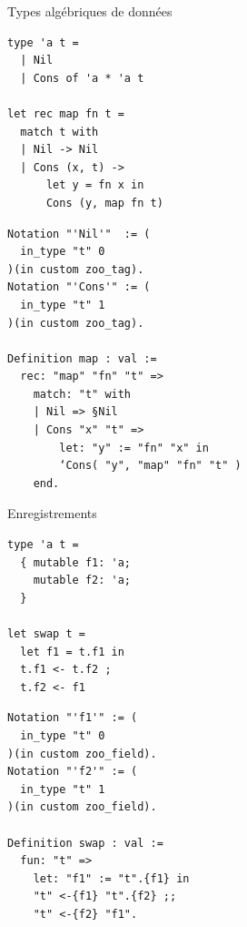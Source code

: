 \begin{frame}[fragile]{Types algébriques de données}
\begin{minipage}{0.49\textwidth}
  \begin{verbatim}
type 'a t =
  | Nil
  | Cons of 'a * 'a t

let rec map fn t =
  match t with
  | Nil -> Nil
  | Cons (x, t) ->
      let y = fn x in
      Cons (y, map fn t)
  \end{verbatim}
\end{minipage}
\begin{minipage}{0.5\textwidth}
  \begin{verbatim}
Notation "'Nil'"  := (
  in_type "t" 0
)(in custom zoo_tag).
Notation "'Cons'" := (
  in_type "t" 1
)(in custom zoo_tag).

Definition map : val :=
  rec: "map" "fn" "t" =>
    match: "t" with
    | Nil => §Nil
    | Cons "x" "t" =>
        let: "y" := "fn" "x" in
        ‘Cons( "y", "map" "fn" "t" )
    end.
  \end{verbatim}
\end{minipage}
\end{frame}

\begin{frame}[fragile]{Enregistrements}
\begin{minipage}{0.49\textwidth}
  \begin{verbatim}
type 'a t =
  { mutable f1: 'a;
    mutable f2: 'a;
  }

let swap t =
  let f1 = t.f1 in
  t.f1 <- t.f2 ;
  t.f2 <- f1
  \end{verbatim}
\end{minipage}
\begin{minipage}{0.5\textwidth}
  \begin{verbatim}
Notation "'f1'" := (
  in_type "t" 0
)(in custom zoo_field).
Notation "'f2'" := (
  in_type "t" 1
)(in custom zoo_field).

Definition swap : val :=
  fun: "t" =>
    let: "f1" := "t".{f1} in
    "t" <-{f1} "t".{f2} ;;
    "t" <-{f2} "f1".
  \end{verbatim}
\end{minipage}
\end{frame}

